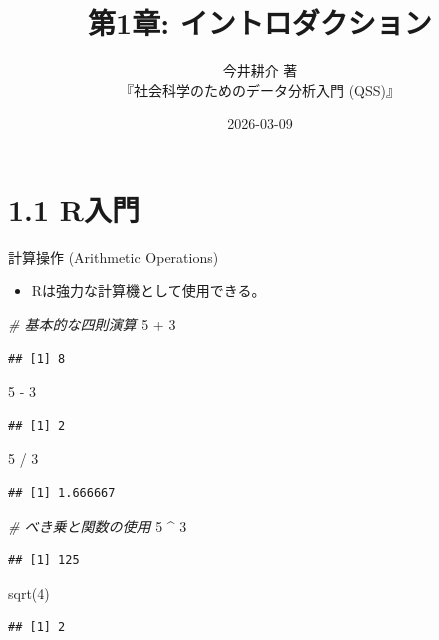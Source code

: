 \documentclass[
  ignorenonframetext,
]{beamer}
\title{第1章: イントロダクション}
\subtitle{今井耕介 著\\
『社会科学のためのデータ分析入門 (QSS)』}
\author{}
\date{\vspace{-2.5em}2026-03-09}
\newenvironment{Shaded}{\begin{snugshade}}{\end{snugshade}}
\newcommand{\CommentTok}[1]{\textcolor[rgb]{0.56,0.35,0.01}{\textit{#1}}}
\newcommand{\DecValTok}[1]{\textcolor[rgb]{0.00,0.00,0.81}{#1}}
\newcommand{\FunctionTok}[1]{\textcolor[rgb]{0.00,0.00,0.00}{#1}}
\newcommand{\NormalTok}[1]{#1}
\newcommand{\SpecialCharTok}[1]{\textcolor[rgb]{0.00,0.00,0.00}{#1}}
\providecommand{\tightlist}{%
  \setlength{\itemsep}{0pt}\setlength{\parskip}{0pt}}
\begin{document}
\frame{\titlepage}

\hypertarget{rux5165ux9580}{%
\section{1.1 R入門}\label{rux5165ux9580}}

\begin{frame}[fragile]{計算操作 (Arithmetic Operations)}
\protect\hypertarget{ux8a08ux7b97ux64cdux4f5c-arithmetic-operations}{}
\begin{itemize}
\tightlist
\item
  Rは強力な計算機として使用できる。
\end{itemize}

\begin{Shaded}
\begin{Highlighting}[]
\CommentTok{\# 基本的な四則演算}
\DecValTok{5} \SpecialCharTok{+} \DecValTok{3}
\end{Highlighting}
\end{Shaded}

\begin{verbatim}
## [1] 8
\end{verbatim}

\begin{Shaded}
\begin{Highlighting}[]
\DecValTok{5} \SpecialCharTok{{-}} \DecValTok{3}
\end{Highlighting}
\end{Shaded}

\begin{verbatim}
## [1] 2
\end{verbatim}

\begin{Shaded}
\begin{Highlighting}[]
\DecValTok{5} \SpecialCharTok{/} \DecValTok{3}
\end{Highlighting}
\end{Shaded}

\begin{verbatim}
## [1] 1.666667
\end{verbatim}

\begin{Shaded}
\begin{Highlighting}[]
\CommentTok{\# べき乗と関数の使用}
\DecValTok{5} \SpecialCharTok{\^{}} \DecValTok{3}
\end{Highlighting}
\end{Shaded}

\begin{verbatim}
## [1] 125
\end{verbatim}

\begin{Shaded}
\begin{Highlighting}[]
\FunctionTok{sqrt}\NormalTok{(}\DecValTok{4}\NormalTok{)}
\end{Highlighting}
\end{Shaded}

\begin{verbatim}
## [1] 2
\end{verbatim}
\end{frame}
\end{document}
